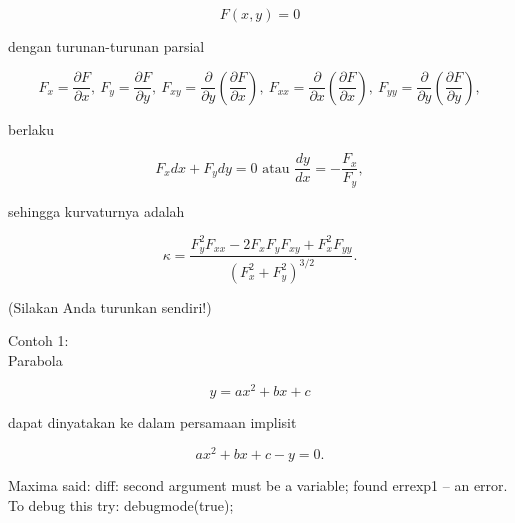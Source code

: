 \documentclass[a4paper,10pt]{article}
\begin{document}
\begin{eulernotebook}
\begin{eulercomment}
\begin{eulercomment}
\begin{eulercomment}
\begin{eulercomment}
\begin{eulercomment}
\end{eulercomment}
\begin{eulerformula}
\[
F(x,y)=0
\]
\end{eulerformula}
\begin{eulercomment}
dengan turunan-turunan parsial

\end{eulercomment}
\begin{eulerformula}
\[
F_x=\frac{\partial F}{\partial x},\ F_y=\frac{\partial F}{\partial y},\ F_{xy}=\frac{\partial}{\partial y}\left(\frac{\partial F}{\partial x}\right),\ F_{xx}=\frac{\partial}{\partial x}\left(\frac{\partial F}{\partial x}\right),\ F_{yy}=\frac{\partial}{\partial y}\left(\frac{\partial F}{\partial y}\right),
\]
\end{eulerformula}
\begin{eulercomment}
berlaku

\end{eulercomment}
\begin{eulerformula}
\[
F_x dx+ F_y dy = 0\text{ atau } \frac{dy}{dx}=-\frac{F_x}{F_y},
\]
\end{eulerformula}
\begin{eulercomment}
sehingga kurvaturnya adalah

\end{eulercomment}
\begin{eulerformula}
\[
\kappa =\frac {F_y^2F_{xx}-2F_xF_yF_{xy}+F_x^2F_{yy}}{\left(F_x^2+F_y^2\right)^{3/2}}.
\]
\end{eulerformula}
\begin{eulercomment}
(Silakan Anda turunkan sendiri!)

Contoh 1:\\
Parabola 

\end{eulercomment}
\begin{eulerformula}
\[
y=ax^2+bx+c
\]
\end{eulerformula}
\begin{eulercomment}
dapat dinyatakan ke dalam persamaan implisit

\end{eulercomment}
\begin{eulerformula}
\[
ax^2+bx+c-y=0.
\]
\end{eulerformula}
\begin{euleroutput}
  Maxima said:
  diff: second argument must be a variable; found errexp1
   -- an error. To debug this try: debugmode(true);
  

\end{euleroutput}
\end{eulercomment}
\end{eulercomment}
\end{eulercomment}
\end{eulercomment}
\end{eulernotebook}
\end{document}
